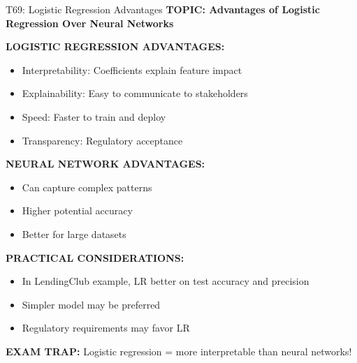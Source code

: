 \documentclass[8pt]{beamer}
\begin{document}
	\begin{frame}{T69: Logistic Regression Advantages}
		\fontsize{6.5}{7.5}\selectfont
		\textbf{TOPIC: Advantages of Logistic Regression Over Neural Networks}
		
		\vspace{0.1cm}
		\textbf{LOGISTIC REGRESSION ADVANTAGES:}
		\begin{itemize}
			\item \textcolor{myblue}{Interpretability:} Coefficients explain feature impact
			\item \textcolor{myblue}{Explainability:} Easy to communicate to stakeholders
			\item \textcolor{myblue}{Speed:} Faster to train and deploy
			\item \textcolor{myblue}{Transparency:} Regulatory acceptance
		\end{itemize}
		
		\vspace{0.1cm}
		\textbf{NEURAL NETWORK ADVANTAGES:}
		\begin{itemize}
			\item Can capture complex patterns
			\item Higher potential accuracy
			\item Better for large datasets
		\end{itemize}
		
		\vspace{0.1cm}
		\textbf{PRACTICAL CONSIDERATIONS:}
		\begin{itemize}
			\item In LendingClub example, LR better on test accuracy and precision
			\item Simpler model may be preferred
			\item Regulatory requirements may favor LR
		\end{itemize}
		
		\textcolor{myred}{\textbf{EXAM TRAP:}} Logistic regression = \textcolor{myblue}{more interpretable} than neural networks!
	\end{frame}
	
\end{document}
